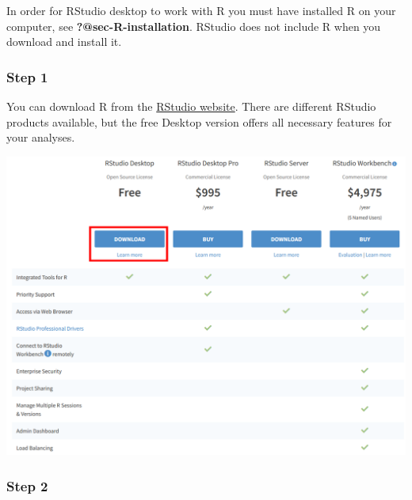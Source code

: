\documentclass[
  letterpaper,
  DIV=11,
  numbers=noendperiod,
  oneside]{scrreprt}
\begin{document}
\begin{tcolorbox}[enhanced jigsaw, colbacktitle=quarto-callout-important-color!10!white, titlerule=0mm, breakable, opacityback=0, opacitybacktitle=0.6, left=2mm, coltitle=black, colback=white, title=\textcolor{quarto-callout-important-color}{\faExclamation}\hspace{0.5em}{Important}, rightrule=.15mm, colframe=quarto-callout-important-color-frame, toprule=.15mm, bottomtitle=1mm, toptitle=1mm, arc=.35mm, bottomrule=.15mm, leftrule=.75mm]
In order for RStudio desktop to work with R you must have installed R on
your computer, see \textbf{?@sec-R-installation}. RStudio does not
include R when you download and install it.
\end{tcolorbox}

\hypertarget{step-1-2}{%
\subsubsection{Step 1}\label{step-1-2}}

You can download R from the
\href{https://www.rstudio.com/products/rstudio/download/}{RStudio
website}. There are different RStudio products available, but the free
Desktop version offers all necessary features for your analyses.

\includegraphics{./images/paste-3C3D0718.png}

\hypertarget{step-2-2}{%
\subsubsection{Step 2}\label{step-2-2}}
\end{document}
